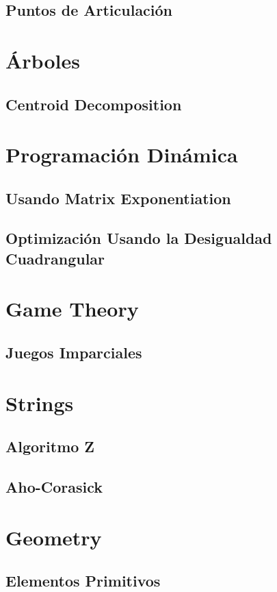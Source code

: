 	\subsection{Puntos de Articulaci\'on}
		

\section{\'Arboles}
	\subsection{Centroid Decomposition}
		

\section{Programaci\'on Din\'amica}
	\subsection{Usando Matrix Exponentiation}
		
	\subsection{Optimizaci\'on Usando la Desigualdad Cuadrangular}
		
\section{Game Theory}
	\subsection{Juegos Imparciales}
		
	
\section{Strings}
	\subsection{Algoritmo Z}
			
	\subsection{Aho-Corasick}
		 
		
\section{Geometry}
	\subsection{Elementos Primitivos}
		
		
\hrulefill

